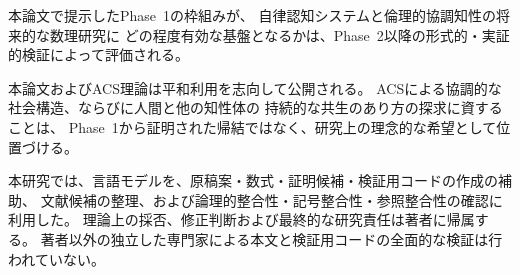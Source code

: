 本論文で提示したPhase~1の枠組みが、
自律認知システムと倫理的協調知性の将来的な数理研究に
どの程度有効な基盤となるかは、Phase~2以降の形式的・実証的検証によって評価される。

\medskip
本論文およびACS理論は平和利用を志向して公開される。
ACSによる協調的な社会構造、ならびに人間と他の知性体の
持続的な共生のあり方の探求に資することは、
Phase~1から証明された帰結ではなく、研究上の理念的な希望として位置づける。

\begin{remark}[AI支援の位置づけ]
\label{rem:ai_assistance}
本研究では、言語モデルを、原稿案・数式・証明候補・検証用コードの作成の補助、
文献候補の整理、および論理的整合性・記号整合性・参照整合性の確認に利用した。
理論上の採否、修正判断および最終的な研究責任は著者に帰属する。
著者以外の独立した専門家による本文と検証用コードの全面的な検証は行われていない。
\end{remark}

